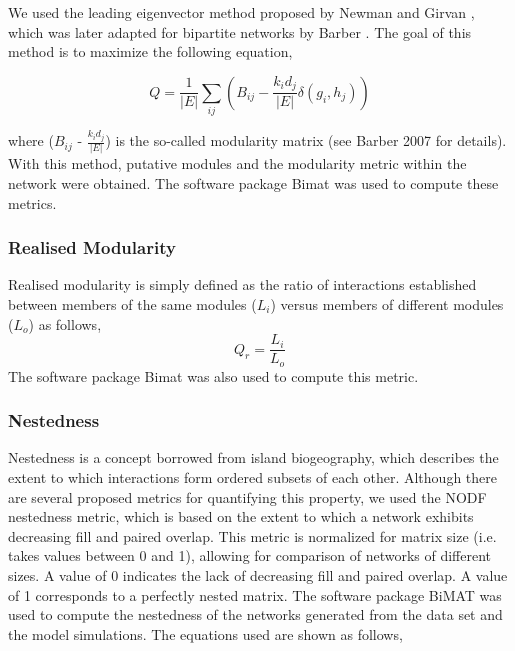 \documentclass[fleqn,10pt]{wlscirep}
\begin{document}
We used the leading eigenvector method proposed by Newman and Girvan \cite{newman2004finding}, which was later adapted for bipartite networks by Barber \cite{barber2007modularity}. The goal of this method is to maximize the following equation, 

\begin{equation}
Q = \frac{1}{|E|}\sum_{ij} (B_{ij} - \frac{k_id_j}{|E|}\delta(g_i,h_j))
\end{equation}

where ($B_{ij}$ - $\frac{k_id_j}{|E|}$) is the so-called modularity matrix (see Barber 2007\cite{barber2007modularity} for details). With this method, putative modules and the modularity metric within the network were obtained. The software package Bimat \cite{flores2016bimat} was used to compute these metrics.

\subsubsection{Realised Modularity}
Realised modularity is simply defined as the ratio of interactions established between members of the same modules ($L_i$) versus members of different modules ($L_o$)\cite{poisot2013measure} as follows,
\begin{equation}
Q_r = \frac{L_i}{L_o}
\end{equation}
The software package Bimat \cite{flores2016bimat} was also used to compute this metric.

\subsubsection{Nestedness}
\label{sec:mat:net:nest}
Nestedness is a concept borrowed from island biogeography\cite{atmar1993measure}, which describes the extent to which interactions form ordered subsets of each other\cite{bascompte2006structure}. Although there are several proposed metrics for quantifying this property, we used the NODF nestedness metric, which is based on the extent to which a network exhibits decreasing fill and paired overlap. This metric is normalized for matrix size (i.e. takes values between 0 and 1), allowing for comparison of networks of different sizes. A value of 0 indicates the lack of decreasing fill and paired overlap. A value of 1 corresponds to a perfectly nested matrix. The software package BiMAT \cite{flores2016bimat} was used to compute the nestedness of the networks generated from the data set and the model simulations.  The equations  used are shown as follows, 
\end{document}
